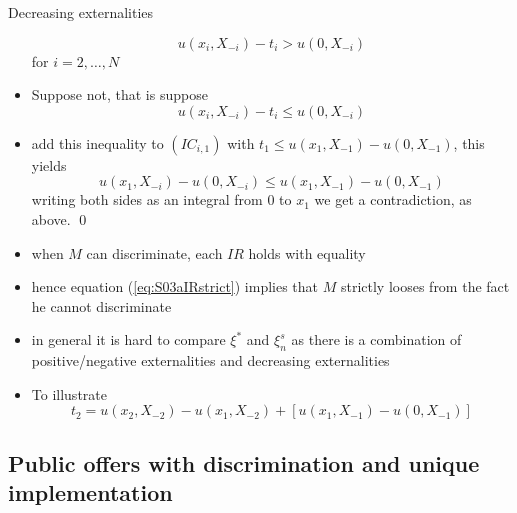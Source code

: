 \documentclass[11pt,english]{beamer}
\begin{document}
\begin{frame}[allowframebreaks]{Decreasing externalities}
\begin{itemize}
    \begin{equation} \label{eq:S03aIRstrict}
      u(x_i,X_{-i}) -t_i > u(0,X_{-i})
    \end{equation}
    for $i = 2,\ldots,N$
  \item Suppose not, that is suppose
    \begin{equation*}
      u(x_i,X_{-i}) -t_i \leq u(0,X_{-i})
    \end{equation*}
  \item add this inequality to $(IC_{i,1})$ with $t_1 \leq
    u(x_1,X_{-1})-u(0,X_{-1})$, this yields
    \begin{equation*}
      u(x_1,X_{-i})-u(0,X_{-i}) \leq  u(x_1,X_{-1})-u(0,X_{-1})
    \end{equation*}
    writing both sides as an integral from $0$ to $x_1$ we get a
    contradiction, as above. \qed
  \item when $M$ can discriminate, each $IR$ holds with equality
  \item hence equation (\ref{eq:S03aIRstrict}) implies that $M$
    strictly looses from the fact he cannot discriminate
  \item in general it is hard to compare $\xi^*$ and $\xi_n^s$ as
    there is a combination of positive/negative externalities and
    decreasing externalities
  \item To illustrate
    \begin{equation*}
      t_2 = u(x_2,X_{-2})-u(x_1,X_{-2})+[u(x_1,X_{-1})-u(0,X_{-1})]
    \end{equation*}
  \end{itemize}
\end{frame}


\subsection{Public offers with discrimination and unique
  implementation}
\end{document}
